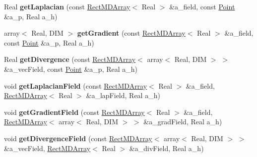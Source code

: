 \begin{DoxyCompactItemize}
\item 
\hypertarget{classRectMDOperators_a64e546d7304f8a28782683a7788b7023}{}Real {\bfseries get\+Laplacian} (const \hyperlink{classRectMDArray}{Rect\+M\+D\+Array}$<$ Real $>$ \&a\+\_\+field, const \hyperlink{classPoint}{Point} \&a\+\_\+p, Real a\+\_\+h)\label{classRectMDOperators_a64e546d7304f8a28782683a7788b7023}

\item 
\hypertarget{classRectMDOperators_a52d79cf50e2eba08f70725de6b8d06dd}{}array$<$ Real, D\+I\+M $>$ {\bfseries get\+Gradient} (const \hyperlink{classRectMDArray}{Rect\+M\+D\+Array}$<$ Real $>$ \&a\+\_\+field, const \hyperlink{classPoint}{Point} \&a\+\_\+p, Real a\+\_\+h)\label{classRectMDOperators_a52d79cf50e2eba08f70725de6b8d06dd}

\item 
\hypertarget{classRectMDOperators_a98c69a17cb3e734bf0b87b88f3a58a44}{}Real {\bfseries get\+Divergence} (const \hyperlink{classRectMDArray}{Rect\+M\+D\+Array}$<$ array$<$ Real, D\+I\+M $>$ $>$ \&a\+\_\+vec\+Field, const \hyperlink{classPoint}{Point} \&a\+\_\+p, Real a\+\_\+h)\label{classRectMDOperators_a98c69a17cb3e734bf0b87b88f3a58a44}

\item 
\hypertarget{classRectMDOperators_aa2ed5097ef35e88f23d69113da58f101}{}void {\bfseries get\+Laplacian\+Field} (const \hyperlink{classRectMDArray}{Rect\+M\+D\+Array}$<$ Real $>$ \&a\+\_\+field, \hyperlink{classRectMDArray}{Rect\+M\+D\+Array}$<$ Real $>$ \&a\+\_\+lap\+Field, Real a\+\_\+h)\label{classRectMDOperators_aa2ed5097ef35e88f23d69113da58f101}

\item 
\hypertarget{classRectMDOperators_ae9fc7ba894b8235f33b8f9ca2d36cf16}{}void {\bfseries get\+Gradient\+Field} (const \hyperlink{classRectMDArray}{Rect\+M\+D\+Array}$<$ Real $>$ \&a\+\_\+field, \hyperlink{classRectMDArray}{Rect\+M\+D\+Array}$<$ array$<$ Real, D\+I\+M $>$ $>$ \&a\+\_\+grad\+Field, Real a\+\_\+h)\label{classRectMDOperators_ae9fc7ba894b8235f33b8f9ca2d36cf16}

\item 
\hypertarget{classRectMDOperators_aecd7c2ab2082c8e0d20fb519c4151254}{}void {\bfseries get\+Divergence\+Field} (const \hyperlink{classRectMDArray}{Rect\+M\+D\+Array}$<$ array$<$ Real, D\+I\+M $>$ $>$ \&a\+\_\+vec\+Field, \hyperlink{classRectMDArray}{Rect\+M\+D\+Array}$<$ Real $>$ \&a\+\_\+div\+Field, Real a\+\_\+h)\label{classRectMDOperators_aecd7c2ab2082c8e0d20fb519c4151254}

\end{DoxyCompactItemize}


